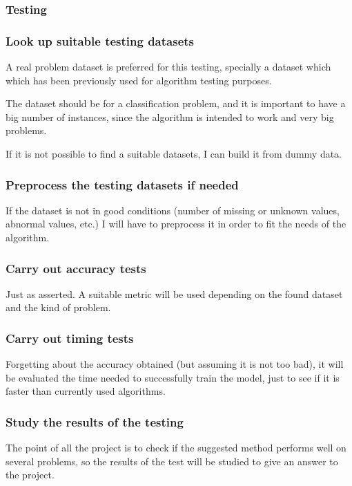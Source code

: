 \documentclass[a4paper]{article}
\begin{document}
            \subsubsection{Testing}
                \subsubsection*{Look up suitable testing datasets}
                A real problem dataset is preferred for this testing, specially a dataset which which has been previously used for algorithm testing purposes.

                The dataset should be for a classification problem, and it is important to have a big number of instances, since the algorithm is intended to work and very big problems.

                If it is not possible to find a suitable datasets, I can build it from dummy data.

                \subsubsection*{Preprocess the testing datasets if needed}
                If the dataset is not in good conditions (number of missing or unknown values, abnormal values, etc.) I will have to preprocess it in order to fit the needs of the algorithm.

                \subsubsection*{Carry out accuracy tests}
                Just as asserted. A suitable metric will be used depending on the found dataset and the kind of problem.

                \subsubsection*{Carry out timing tests}
                Forgetting about the accuracy obtained (but assuming it is not too bad), it will be evaluated the time needed to successfully train the model, just to see if it is faster than currently used algorithms.

                \subsubsection*{Study the results of the testing}
                The point of all the project is to check if the suggested method performs well on several problems, so the results of the test will be studied to give an answer to the project.
\end{document}
